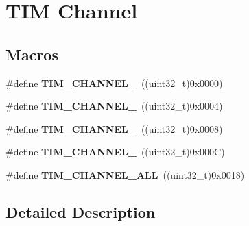 \hypertarget{group___t_i_m___channel}{}\section{T\+IM Channel}
\label{group___t_i_m___channel}
\subsection*{Macros}
\begin{DoxyCompactItemize}
\item 
\#define {\bfseries T\+I\+M\+\_\+\+C\+H\+A\+N\+N\+E\+L\+\_}~((uint32\+\_\+t)0x0000)\hypertarget{group___t_i_m___channel_ga6b1541e4a49d62610899e24bf23f4879}{}\label{group___t_i_m___channel_ga6b1541e4a49d62610899e24bf23f4879}

\item 
\#define {\bfseries T\+I\+M\+\_\+\+C\+H\+A\+N\+N\+E\+L\+\_}~((uint32\+\_\+t)0x0004)\hypertarget{group___t_i_m___channel_ga33e02d43345a7ac5886f01b39e4f7ccd}{}\label{group___t_i_m___channel_ga33e02d43345a7ac5886f01b39e4f7ccd}

\item 
\#define {\bfseries T\+I\+M\+\_\+\+C\+H\+A\+N\+N\+E\+L\+\_}~((uint32\+\_\+t)0x0008)\hypertarget{group___t_i_m___channel_ga4ea100c1789b178f3cb46721b7257e2d}{}\label{group___t_i_m___channel_ga4ea100c1789b178f3cb46721b7257e2d}

\item 
\#define {\bfseries T\+I\+M\+\_\+\+C\+H\+A\+N\+N\+E\+L\+\_}~((uint32\+\_\+t)0x000\+C)\hypertarget{group___t_i_m___channel_gad59ef74820ee8bf77fa1f8d589fde2ac}{}\label{group___t_i_m___channel_gad59ef74820ee8bf77fa1f8d589fde2ac}

\item 
\#define {\bfseries T\+I\+M\+\_\+\+C\+H\+A\+N\+N\+E\+L\+\_\+\+A\+LL}~((uint32\+\_\+t)0x0018)\hypertarget{group___t_i_m___channel_ga6abf8f9fc695b79d8781ca082dfb48bc}{}\label{group___t_i_m___channel_ga6abf8f9fc695b79d8781ca082dfb48bc}

\end{DoxyCompactItemize}


\subsection{Detailed Description}
